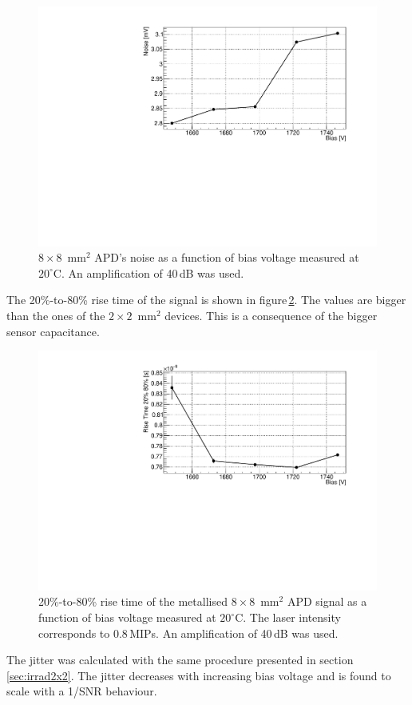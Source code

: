 \documentclass{article}
\begin{document}
\begin{figure}
  \centering
  \includegraphics[width = 0.6 \textwidth]{noise8x8metal}
  \caption{$8 \times 8$~mm$^2$ APD's noise as a function of bias voltage measured at $20^\circ$C. An amplification of 40\,dB was used.}
  \label{fig:noise8x8metal}
\end{figure}

The 20\%-to-80\% rise time of the signal is shown in figure\,\ref{fig:riseTime8x8metal}.
The values are bigger than the ones of the $2 \times 2$~mm$^2$ devices.
This is a consequence of the bigger sensor capacitance.

\begin{figure}
  \centering
  \includegraphics[width = 0.6 \textwidth]{riseTime8x8metal}
  \caption{20\%-to-80\% rise time of the metallised $8 \times 8$~mm$^2$ APD signal as a function of bias voltage measured at $20^\circ$C. The laser intensity corresponds to 0.8\,MIPs. An amplification of 40\,dB was used.}
  \label{fig:riseTime8x8metal}
\end{figure}

The jitter was calculated with the same procedure presented in section\,\ref{sec:irrad2x2}.
The jitter decreases with increasing bias voltage and is found to scale with a 1/SNR behaviour.
\end{document}

